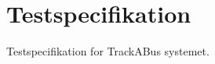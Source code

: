 \documentclass[Main.tex]{subfiles}
\begin{document}
\newpage
\section{Testspecifikation}
Testspecifikation for TrackABus systemet.
\end{document}
